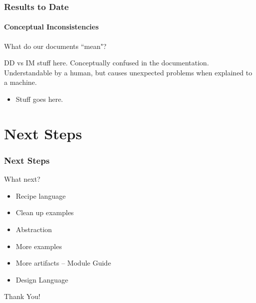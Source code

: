 \documentclass{beamer}
\begin{document}

\begin{frame}[fragile]

\frametitle{Results to Date} %
\framesubtitle{Conceptual Inconsistencies}

What do our documents ``mean"?

DD vs IM stuff here. Conceptually confused in the documentation. 
Understandable by a human, but causes unexpected problems when explained to a machine.

\begin{itemize}
\item Stuff goes here.
\end{itemize}

\end{frame}


\section[Next Steps]{Next Steps}


\begin{frame}

\frametitle{Next Steps}


\begin{Large}
What next?
\end{Large}

\begin{itemize}
\item Recipe language %
\item Clean up examples
\item Abstraction
\item More examples
\item More artifacts -- Module Guide
\item Design Language
\end{itemize}
\end{frame}


\begin{frame}
\begin{center}
\Huge Thank You!
\end{center}
\end{frame}

\end{document}
